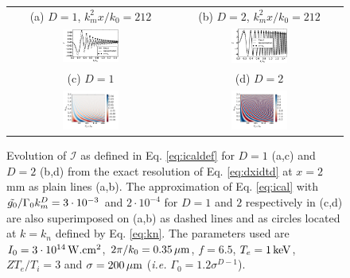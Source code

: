 \documentclass[
 reprint,
 amsmath,amssymb,
 aps,
]{revtex4-1}
\begin{document}
\begin{figure}[!]
\begin{tabular}{cc}
(a) $D=1$, $k_m^2x/k_0=212$
& (b) $D=2$, $k_m^2x/k_0=212$\\
\includegraphics[width=0.35\textwidth]{AD1.eps}
&\includegraphics[width=0.35\textwidth]{AD2.eps}\\
(c) $D=1$ 
& (d) $D=2$\\
\includegraphics[width=0.35\textwidth]{AxkD1.png}
&\includegraphics[width=0.35\textwidth]{AxkD2.png}
\end{tabular}
\caption{ \label{fig:ical}
Evolution of $\mathcal{I}$ as defined in Eq. \eqref{eq:icaldef} for $D=1$ (a,c) and $D=2$ (b,d) from the exact resolution of Eq. \eqref{eq:dxidtd} at $x = 2$ mm as plain lines  (a,b). 
The approximation of Eq. \eqref{eq:ical} with $\Tilde{g_0}/\Gamma_0k_m^{D} = 3\cdot 10^{-3}$  and $2\cdot 10^{-4}$ for $D=1$ and $2$ respectively in (c,d) are also superimposed on (a,b) as dashed lines and as circles located at $k=k_n$ defined by Eq. \eqref{eq:kn}. 
The parameters used are $I_0 = 3\cdot 10^{14}\, \rm W.cm^{2}$, $2\pi/k_0=0.35 \,\rm\mu m$, $f=6.5$, $T_e =1\,\rm  keV$, $ZT_e/T_i=3$ and $\sigma=200\,\rm\mu m$  (\emph{i.e.} $\Gamma_0=1.2\sigma^{D-1}$).
}
\end{figure}
\end{document}
